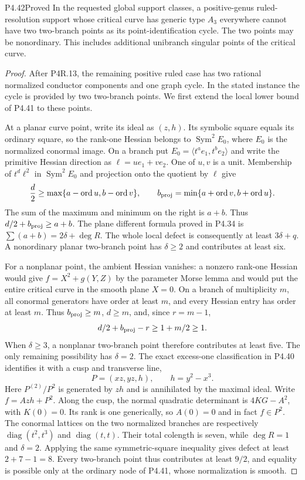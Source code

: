 \begin{statement}{P4.42}{Proved}
In the requested global support classes, a positive-genus
ruled-resolution support whose critical curve has generic
type $A_3$ everywhere cannot have two two-branch points as
its point-identification cycle. The two points may be
nonordinary. This includes additional
unibranch singular points of the critical curve.
\end{statement}
\begin{proof}
After P4R.13, the remaining positive ruled case has two
rational normalized conductor components and one graph
cycle. In the stated instance the cycle is provided by
two two-branch points. We first extend the local lower
bound of P4.41 to these points.

At a planar curve point, write its ideal as $(z,h)$.
Its symbolic square equals its ordinary square, so the
rank-one Hessian belongs to $\operatorname{Sym}^2 E_0$,
where $E_0$ is the normalized conormal image. On a branch
put $E_0=\langle t^a e_1,t^b e_2\rangle$ and write the
primitive Hessian direction as $\ell=u e_1+v e_2$.
One of $u,v$ is a unit. Membership of
$t^d\ell^2$ in $\operatorname{Sym}^2E_0$ and projection
onto the quotient by $\ell$ give
\[
 \frac d2\ge\max\{a-\operatorname{ord}u,
                         b-\operatorname{ord}v\},\qquad
 b_{\rm proj}=\min\{a+\operatorname{ord}v,
                         b+\operatorname{ord}u\}.
\]
The sum of the maximum and minimum on the right is
$a+b$. Thus $d/2+b_{\rm proj}\ge a+b$.
The plane different formula proved in P4.34 is
$\sum(a+b)=2\delta+\deg R$. The whole local defect
is consequently at least $3\delta+q$.
A nonordinary planar two-branch point has $\delta\ge2$
and contributes at least six.

For a nonplanar point, the ambient Hessian vanishes: a
nonzero rank-one Hessian would give $f=X^2+g(Y,Z)$ by
the parameter Morse lemma and would put the entire
critical curve in the smooth plane $X=0$.
On a branch of multiplicity $m$, all conormal generators
have order at least $m$, and every Hessian entry has
order at least $m$. Thus $b_{\rm proj}\ge m$, $d\ge m$,
and, since $r=m-1$,
\[
                  d/2+b_{\rm proj}-r\ge1+m/2\ge1.
\]
When $\delta\ge3$, a nonplanar two-branch point
therefore contributes at least five.
The only remaining possibility has $\delta=2$.
The exact excess-one classification in P4.40 identifies
it with a cusp and transverse line,
\[
                  P=(xz,yz,h),\qquad h=y^2-x^3.
\]
Here $P^{(2)}/P^2$ is generated by $zh$ and is
annihilated by the maximal ideal. Write $f=Azh+P^2$.
Along the cusp, the normal quadratic determinant is
$4KG-A^2$, with $K(0)=0$. Its rank is one generically,
so $A(0)=0$ and in fact $f\in P^2$.
The conormal lattices on the two normalized branches
are respectively $\operatorname{diag}(t^2,t^3)$ and
$\operatorname{diag}(t,t)$. Their total colength is seven,
while $\deg R=1$ and $\delta=2$.
Applying the same symmetric-square inequality gives
defect at least $2+7-1=8$.
Every two-branch point thus contributes at least $9/2$,
and equality is possible only at the ordinary node of
P4.41, whose normalization is smooth.


\end{proof}
